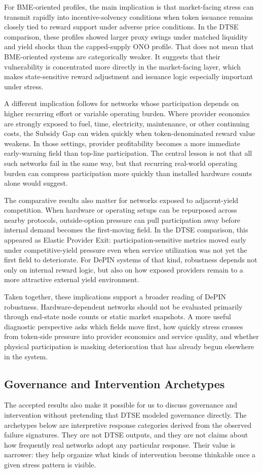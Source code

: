 For BME-oriented profiles, the main implication is that market-facing stress can transmit rapidly into incentive-solvency conditions when token issuance remains closely tied to reward support under adverse price conditions. In the DTSE comparison, these profiles showed larger proxy swings under matched liquidity and yield shocks than the capped-supply ONO profile. That does not mean that BME-oriented systems are categorically weaker. It suggests that their vulnerability is concentrated more directly in the market-facing layer, which makes state-sensitive reward adjustment and issuance logic especially important under stress.

A different implication follows for networks whose participation depends on higher recurring effort or variable operating burden. Where provider economics are strongly exposed to fuel, time, electricity, maintenance, or other continuing costs, the Subsidy Gap can widen quickly when token-denominated reward value weakens. In those settings, provider profitability becomes a more immediate early-warning field than top-line participation. The central lesson is not that all such networks fail in the same way, but that recurring real-world operating burden can compress participation more quickly than installed hardware counts alone would suggest.

The comparative results also matter for networks exposed to adjacent-yield competition. When hardware or operating setups can be repurposed across nearby protocols, outside-option pressure can pull participation away before internal demand becomes the first-moving field. In the DTSE comparison, this appeared as Elastic Provider Exit: participation-sensitive metrics moved early under competitive-yield pressure even when service utilization was not yet the first field to deteriorate. For DePIN systems of that kind, robustness depends not only on internal reward logic, but also on how exposed providers remain to a more attractive external yield environment.

Taken together, these implications support a broader reading of DePIN robustness. Hardware-dependent networks should not be evaluated primarily through end-state node counts or static market snapshots. A more useful diagnostic perspective asks which fields move first, how quickly stress crosses from token-side pressure into provider economics and service quality, and whether physical participation is masking deterioration that has already begun elsewhere in the system.

\subsection{Governance and Intervention Archetypes}
The accepted results also make it possible for us to discuss governance and intervention without pretending that DTSE modeled governance directly. The archetypes below are interpretive response categories derived from the observed failure signatures. They are not DTSE outputs, and they are not claims about how frequently real networks adopt any particular response. Their value is narrower: they help organize what kinds of intervention become thinkable once a given stress pattern is visible.


